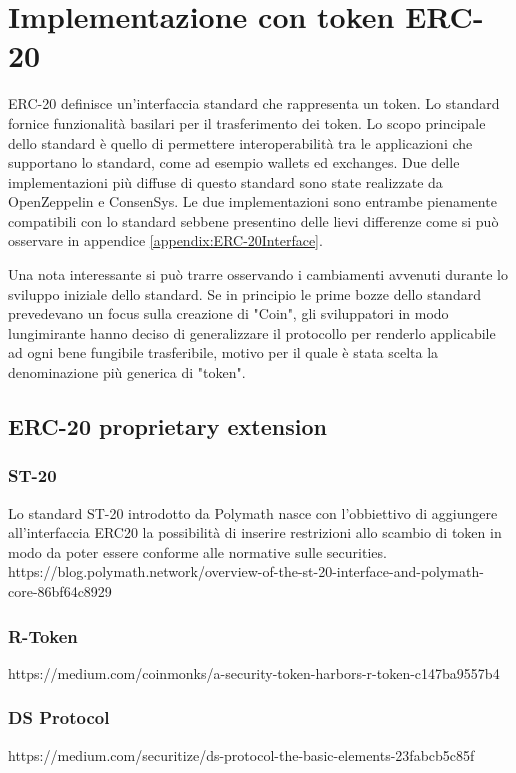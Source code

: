 \section{Implementazione con token ERC-20}
ERC-20 definisce un'interfaccia standard che rappresenta un token. Lo standard fornice funzionalità basilari per il trasferimento dei token. Lo scopo principale dello standard è quello di permettere interoperabilità tra le applicazioni che supportano lo standard, come ad esempio wallets ed exchanges. 
Due delle implementazioni più diffuse di questo standard sono state realizzate da OpenZeppelin e ConsenSys. Le due implementazioni sono entrambe pienamente compatibili con lo standard sebbene presentino delle lievi differenze come si può osservare in appendice \ref{appendix:ERC-20Interface}.

Una nota interessante si può trarre osservando i cambiamenti avvenuti durante lo sviluppo iniziale dello standard. Se in principio le prime bozze dello standard prevedevano un focus sulla creazione di "Coin", gli sviluppatori in modo lungimirante hanno deciso di generalizzare il protocollo per renderlo applicabile ad ogni bene fungibile trasferibile, motivo per il quale è stata scelta la denominazione più generica di "token"\cite{https://www.reddit.com/r/ethereum/comments/3n8fkn/lets_talk_about_the_coin_standard/}.


\subsection{ERC-20 proprietary extension}
\subsubsection{ST-20}
Lo standard ST-20 introdotto da Polymath nasce con l'obbiettivo di aggiungere all'interfaccia ERC20 la possibilità di inserire restrizioni allo scambio di token in modo da poter essere conforme alle normative sulle securities. 
https://blog.polymath.network/overview-of-the-st-20-interface-and-polymath-core-86bf64c8929
\subsubsection{R-Token}
https://medium.com/coinmonks/a-security-token-harbors-r-token-c147ba9557b4
\subsubsection{DS Protocol}
https://medium.com/securitize/ds-protocol-the-basic-elements-23fabcb5c85f
